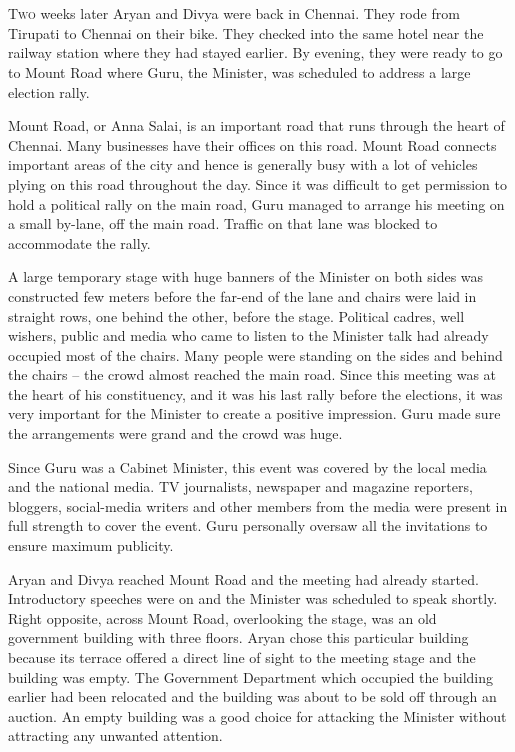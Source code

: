 \chapter{}

\lettrine{T}{wo} weeks later Aryan and Divya were back in Chennai. They rode from Tirupati to
Chennai on their bike. They checked into the same hotel near the railway station
where they had stayed earlier. By evening, they were ready to go to Mount Road
where Guru, the Minister, was scheduled to address a large election rally.

Mount Road, or Anna Salai, is an important road that runs through the heart of
Chennai. Many businesses have their offices on this road. Mount Road connects
important areas of the city and hence is generally busy with a lot of vehicles
plying on this road throughout the day. Since it was difficult to get permission
to hold a political rally on the main road, Guru managed to arrange his meeting
on a small by-lane, off the main road. Traffic on that lane was blocked to
accommodate the rally.

A large temporary stage with huge banners of the Minister on both sides was
constructed few meters before the far-end of the lane and chairs were laid in
straight rows, one behind the other, before the stage. Political cadres, well
wishers, public and media who came to listen to the Minister talk had already
occupied most of the chairs. Many people were standing on the sides and behind
the chairs – the crowd almost reached the main road. Since this meeting was at
the heart of his constituency, and it was his last rally before the elections,
it was very important for the Minister to create a positive impression. Guru
made sure the arrangements were grand and the crowd was huge.

Since Guru was a Cabinet Minister, this event was covered by the local media and
the national media. TV journalists, newspaper and magazine reporters, bloggers,
social-media writers and other members from the media were present in full
strength to cover the event. Guru personally oversaw all the invitations to
ensure maximum publicity.

Aryan and Divya reached Mount Road and the meeting had already started.
Introductory speeches were on and the Minister was scheduled to speak shortly.
Right opposite, across Mount Road, overlooking the stage, was an old government
building with three floors. Aryan chose this particular building because its
terrace offered a direct line of sight to the meeting stage and the building was
empty. The Government Department which occupied the building earlier had been
relocated and the building was about to be sold off through an auction. An empty
building was a good choice for attacking the Minister without attracting any
unwanted attention.

